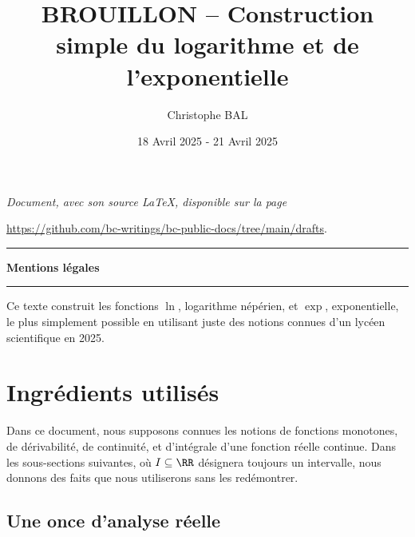 \documentclass[12pt]{amsart}
\begin{document}
\title{BROUILLON -- Construction simple du logarithme et de l'exponentielle}
\author{Christophe BAL}
\date{18 Avril 2025 - 21 Avril 2025}

\maketitle

\begin{center}
	\itshape
	Document, avec son source \LaTeX, disponible sur la page

	\url{https://github.com/bc-writings/bc-public-docs/tree/main/drafts}.
\end{center}


\bigskip


\begin{center}
	\hrule\vspace{.3em}
	{
		\fontsize{1.35em}{1em}\selectfont
		\textbf{Mentions \og légales \fg}
	}

	\vspace{0.45em}
	\doclicenseThis
	\hrule
\end{center}


\bigskip


\setcounter{tocdepth}{2}
\tableofcontents




\newpage

\begin{meta-abstract*}
	Ce texte construit les fonctions $\ln$, logarithme népérien, et $\exp$, exponentielle, le plus simplement possible en utilisant juste des notions connues d'un lycéen scientifique en 2025.
\end{meta-abstract*}




\section{Ingrédients utilisés}

Dans ce document,
nous supposons connues les notions
de fonctions monotones,
de dérivabilité,
de continuité,
et
d'intégrale d'une fonction réelle continue.
%
Dans les sous-sections suivantes, où $I \subseteq \RR$ désignera toujours un intervalle, nous donnons des faits que nous utiliserons sans les redémontrer.


	\subsection{Une once d'analyse réelle}
\end{document}

